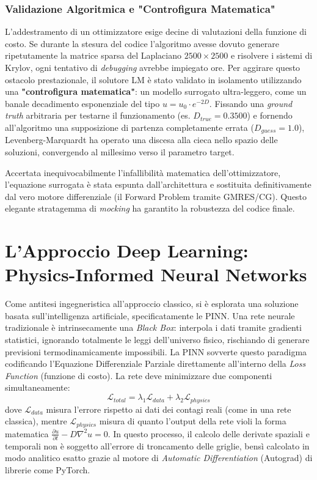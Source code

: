 \documentclass[12pt,a4paper]{article}
\begin{document}
\subsubsection{Validazione Algoritmica e "Controfigura Matematica"}
L'addestramento di un ottimizzatore esige decine di valutazioni della funzione di costo. Se durante la stesura del codice l'algoritmo avesse dovuto generare ripetutamente la matrice sparsa del Laplaciano $2500 \times 2500$ e risolvere i sistemi di Krylov, ogni tentativo di \textit{debugging} avrebbe impiegato ore. 
Per aggirare questo ostacolo prestazionale, il solutore LM è stato validato in isolamento utilizzando una \textbf{"controfigura matematica"}: un modello surrogato ultra-leggero, come un banale decadimento esponenziale del tipo $u = u_0 \cdot e^{-2D}$. Fissando una \textit{ground truth} arbitraria per testarne il funzionamento (es. $D_{true} = 0.3500$) e fornendo all'algoritmo una supposizione di partenza completamente errata ($D_{guess} = 1.0$), Levenberg-Marquardt ha operato una discesa alla cieca nello spazio delle soluzioni, convergendo al millesimo verso il parametro target. 

Accertata inequivocabilmente l'infallibilità matematica dell'ottimizzatore, l'equazione surrogata è stata espunta dall'architettura e sostituita definitivamente dal vero motore differenziale (il Forward Problem tramite GMRES/CG). Questo elegante stratagemma di \textit{mocking} ha garantito la robustezza del codice finale.


\section{L'Approccio Deep Learning: Physics-Informed Neural Networks}
Come antitesi ingegneristica all'approccio classico, si è esplorata una soluzione basata sull'intelligenza artificiale, specificatamente le PINN. 
Una rete neurale tradizionale è intrinsecamente una \textit{Black Box}: interpola i dati tramite gradienti statistici, ignorando totalmente le leggi dell'universo fisico, rischiando di generare previsioni termodinamicamente impossibili.
La PINN sovverte questo paradigma codificando l'Equazione Differenziale Parziale direttamente all'interno della \textit{Loss Function} (funzione di costo). La rete deve minimizzare due componenti simultaneamente:
\begin{equation}
    \mathcal{L}_{total} = \lambda_1 \mathcal{L}_{data} + \lambda_2 \mathcal{L}_{physics}
\end{equation}
dove $\mathcal{L}_{data}$ misura l'errore rispetto ai dati dei contagi reali (come in una rete classica), mentre $\mathcal{L}_{physics}$ misura di quanto l'output della rete violi la forma matematica $\frac{\partial u}{\partial t} - D \nabla^2 u = 0$. In questo processo, il calcolo delle derivate spaziali e temporali non è soggetto all'errore di troncamento delle griglie, bensì calcolato in modo analitico esatto grazie al motore di \textit{Automatic Differentiation} (Autograd) di librerie come PyTorch.
\end{document}
